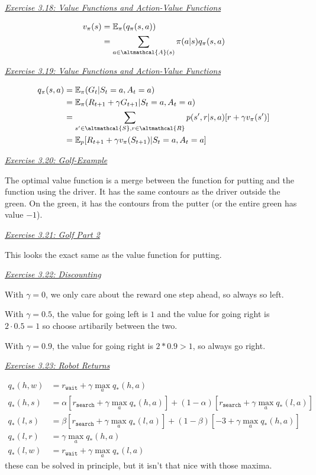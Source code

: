 \documentclass{article}
\newcommand{\myq}[1]{%
	\vspace{1em}
	\noindent\underline{\emph{Exercise #1}}\vspace{0.25em}\linebreak
}
\begin{document}
\myq{3.18: Value Functions and Action-Value Functions}
\begin{align}
v_\pi(s) &= \mathbb{E}_\pi(q_\pi(s, a)) \nonumber \\ 
&= \sum_{a \in \altmathcal{A}(s)} \pi(a | s) q_\pi(s, a)
\end{align}

\myq{3.19: Value Functions and Action-Value Functions}
\begin{align}
q_\pi(s, a) &= \mathbb{E}_\pi(G_t | S_t = a, A_t = a) \nonumber \\
& = \mathbb{E}_\pi(R_{t+1} + \gamma G_{t+1} | S_t = a, A_t = a) \nonumber \\
&= \sum_{s' \in \altmathcal{S}, r \in \altmathcal{R}} p(s', r | s, a) [r + \gamma v_\pi(s')] \nonumber \\
&= \mathbb{E}_p [R_{t+1} + \gamma v_\pi(S_{t+1}) | S_t = a, A_t = a]
\end{align}

\myq{3.20: Golf-Example}
The optimal value function is a merge between the function for putting and the function using the driver. It has the same contours as the driver outside the green. On the green, it has the contours from the putter (or the entire green has value $-1$). 

\myq{3.21: Golf Part 2}
This looks the exact same as the value function for putting. 

\myq{3.22: Discounting}
With $\gamma=0$, we only care about the reward one step ahead, so always so left. 

With $\gamma=0.5$, the value for going left is $1$ and the value for going right is $2 \cdot 0.5 = 1$ so choose artibarily between the two. 

With $\gamma=0.9$, the value for going right is $2*0.9 > 1$, so always go right. 

\myq{3.23: Robot Returns}
\begin{align}
q_*(h, w) &= r_{\texttt{wait}} + \gamma \max_a q_*(h, a) \\
q_*(h, s) &= \alpha [r_{\texttt{search}} + \gamma \max_a q_*(h, a)] + (1-\alpha)[r_{\texttt{search}} + \gamma \max_a q_*(l, a)] \\
q_*(l, s) &= \beta[r_{\texttt{search}} + \gamma \max_a q_*(l, a)] + (1-\beta)[-3 + \gamma \max_a q_*(h, a)]\\
q_*(l, r) &=  \gamma \max_a q_*(h, a)\\
q_*(l, w) &= r_{\texttt{wait}} + \gamma \max_a q_*(l, a)
\end{align}
these can be solved in principle, but it isn't that nice with those maxima. 
\end{document}
